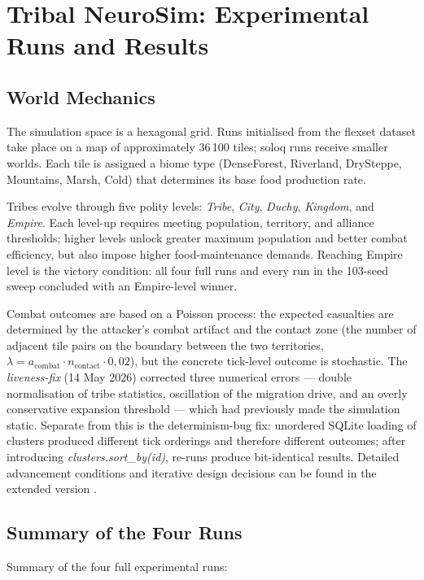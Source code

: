 \chapter{Tribal NeuroSim: Experimental Runs and Results}

\section{World Mechanics}

The simulation space is a hexagonal grid. Runs initialised from the flexset dataset take place on a map of approximately 36\,100 tiles; soloq runs receive smaller worlds. Each tile is assigned a biome type (DenseForest, Riverland, DrySteppe, Mountains, Marsh, Cold) that determines its base food production rate.

Tribes evolve through five polity levels: \textit{Tribe}, \textit{City}, \textit{Duchy}, \textit{Kingdom}, and \textit{Empire}. Each level-up requires meeting population, territory, and alliance thresholds; higher levels unlock greater maximum population and better combat efficiency, but also impose higher food-maintenance demands. Reaching Empire level is the victory condition: all four full runs and every run in the 103-seed sweep concluded with an Empire-level winner.

Combat outcomes are based on a Poisson process: the expected casualties are determined by the attacker's combat artifact and the contact zone (the number of adjacent tile pairs on the boundary between the two territories, $\lambda = a_{\text{combat}} \cdot n_{\text{contact}} \cdot 0{,}02$), but the concrete tick-level outcome is stochastic. The \textit{liveness-fix} (14 May 2026) corrected three numerical errors --- double normalisation of tribe statistics, oscillation of the migration drive, and an overly conservative expansion threshold --- which had previously made the simulation static. Separate from this is the determinism-bug fix: unordered SQLite loading of clusters produced different tick orderings and therefore different outcomes; after introducing \textit{clusters.sort\_by(id)}, re-runs produce bit-identical results. Detailed advancement conditions and iterative design decisions can be found in the extended version \cite{premadegraph-full}.

\section{Summary of the Four Runs}

Summary of the four full experimental runs:

